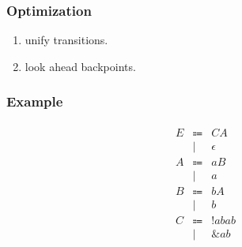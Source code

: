 \subsubsection{Optimization}

\begin{enumerate}
  \item unify transitions.
  \item look ahead backpoints.
\end{enumerate}

\subsubsection{Example}

\begin{align*}
  \begin{array}{rcl}
  E
  & \Coloneq & C A \\
  & \mid & \epsilon \\
  A
  & \Coloneq & a B \\
  & \mid & a \\
  B
  & \Coloneq & b A \\
  & \mid & b \\
  C
  & \Coloneq & \mathop{!} abab \\
  & \mid & \mathop{\&} ab
  \end{array}
\end{align*}

